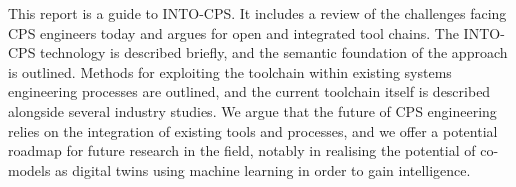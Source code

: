 \documentclass[a4paper,12pt,final]{include/intocpsassociation}   %
\newenvironment{assumption}{\noindent\smallskip\color{blue}\begin{framed}\begin{minipage}{0.95\columnwidth}}{\end{minipage}\end{framed}\smallskip\par}
\begin{document}
This report is a guide to INTO-CPS. It includes a review of the challenges facing CPS engineers today and argues for open and integrated tool chains. The INTO-CPS technology is described briefly, and the semantic foundation of the approach is outlined. Methods for exploiting the toolchain within existing systems engineering processes are outlined, and the current toolchain itself is described alongside several industry studies. We argue that the future of CPS engineering relies on the integration of existing tools and processes, and we offer a potential roadmap for future research in the field, notably in realising the potential of co-models as digital twins using machine learning in order to gain intelligence.
\newpage
%
\tableofcontents
\newpage
%
%
%
%
%
%

\clearpage

\clearpage

\clearpage

\clearpage

\clearpage

\clearpage

\clearpage

\clearpage

\clearpage
%
%
%
%


\label{ch:bib} %
%
%
%
\clearpage
%
%
%
\appendix

\clearpage

\clearpage

%
%
%
\end{document}
